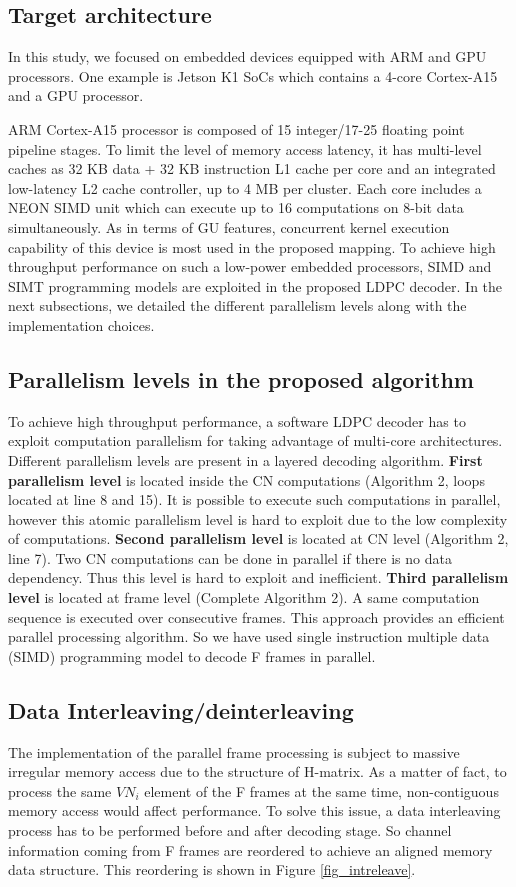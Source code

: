 \documentclass[conference]{IEEEtran}
\begin{document}
\subsection{Target architecture} \label{target_architecture}
In this study, we focused on embedded devices equipped with ARM and GPU processors. One example is Jetson K1 SoCs which contains a 4-core Cortex-A15 and a GPU processor.

ARM Cortex-A15 processor is composed of 15 integer/17-25 floating point pipeline stages. To limit the level of memory access latency, it has multi-level caches as 32 KB data + 32 KB instruction L1 cache per core and an integrated low-latency L2 cache controller, up to 4 MB per cluster. Each core includes a NEON SIMD unit which can execute up to 16 computations on 8-bit data simultaneously. As in terms of GU features, concurrent kernel execution capability of this device is most used in the proposed mapping. To achieve high throughput performance on such a low-power embedded processors, SIMD and SIMT programming models are exploited in the proposed LDPC decoder. In the next subsections, we detailed the different parallelism levels along with the implementation choices.

\subsection{Parallelism levels in the proposed algorithm}
To achieve high throughput performance, a software LDPC decoder has to exploit computation parallelism for taking advantage of multi-core architectures. Different parallelism levels are present in a layered decoding algorithm. \textbf{First parallelism level} is located inside the CN computations (Algorithm 2, loops located at line 8 and 15). It is possible to execute such computations in parallel, however this atomic parallelism level is hard to exploit due to the low complexity of computations. \textbf{Second parallelism level} is located at CN level (Algorithm 2, line 7). Two CN computations can be done in parallel if there is no data dependency. Thus this level is hard to exploit and inefficient. \textbf{Third parallelism level} is located at frame level (Complete Algorithm 2). A same computation sequence is executed over consecutive frames. This approach provides an efficient parallel processing algorithm. So we have used single instruction multiple data (SIMD) programming model to decode F frames in parallel. 

\subsection{Data Interleaving/deinterleaving}
The implementation of the parallel frame processing is subject to massive irregular memory access due to the structure of H-matrix. As a matter of fact, to process the same $VN_i$ element of the F frames at the same time, non-contiguous memory access would affect performance. To solve this issue, a data interleaving process has to be performed before and after decoding stage. So channel information coming from F frames are reordered to achieve an aligned memory data structure. This reordering is shown in Figure \ref{fig_intreleave}.
\end{document}
